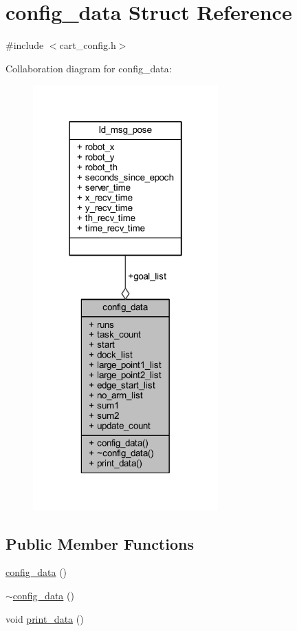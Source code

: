 \hypertarget{structconfig__data}{}\section{config\+\_\+data Struct Reference}
\label{structconfig__data}


{\ttfamily \#include $<$cart\+\_\+config.\+h$>$}



Collaboration diagram for config\+\_\+data\+:
\nopagebreak
\begin{figure}[H]
\begin{center}
\leavevmode
\includegraphics[width=202pt]{structconfig__data__coll__graph}
\end{center}
\end{figure}
\subsection*{Public Member Functions}
\begin{DoxyCompactItemize}
\item 
\mbox{\hyperlink{structconfig__data_abd628560b6b09ef4b0529e8572f24f9e}{config\+\_\+data}} ()
\item 
\mbox{\hyperlink{structconfig__data_aed1555d45e92f85719bc56eed907c240}{$\sim$config\+\_\+data}} ()
\item 
void \mbox{\hyperlink{structconfig__data_a7131e30339dc86bc7e0f8c211e1a7f87}{print\+\_\+data}} ()
\end{DoxyCompactItemize}
